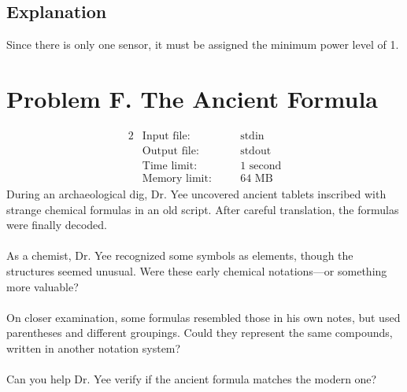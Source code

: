 \documentclass[12pt,a4paper]{article}
\begin{document}
\subsection*{\fontsize{16}{12}Explanation}
Since there is only one sensor, it must be assigned the minimum power level of 1.

\newpage

\section*{\fontsize{18}{12}Problem F. The Ancient Formula}

\begin{alignat*} {2}
 &   \text{Input file:}   \quad     &&\text{stdin}\\
 &   \text{Output file:}  \quad     &&\text{stdout}\\
 &   \text{Time limit:}   \quad     &&\text{1 second}\\
 &   \text{Memory limit:} \quad     &&\text{64 MB}
\end{alignat*}
\noindent
During an archaeological dig, Dr. Yee uncovered ancient tablets inscribed with strange chemical formulas in an old script. After careful translation, the formulas were finally decoded.
\\\\
\noindent
As a chemist, Dr. Yee recognized some symbols as elements, though the structures seemed unusual. Were these early chemical notations—or something more valuable?
\\\\
\noindent
On closer examination, some formulas resembled those in his own notes, but used parentheses and different groupings. Could they represent the same compounds, written in another notation system?
\\\\
\noindent
Can you help Dr. Yee verify if the ancient formula matches the modern one?
\end{document}
